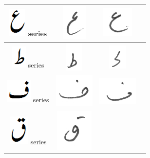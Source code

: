 \documentclass[a4paper,conference]{IEEEtran}
\begin{document}
\begin{table}[h]
\begin{tabular}{@{}cccc@{}}
\hline
\includegraphics[scale=0.15]{aien_orig} series & 
\includegraphics[scale=0.15]{165} & \includegraphics[scale=0.15]{166} &  \\
\hline
\includegraphics[scale=0.15]{tuay_orig} series & \includegraphics[scale=0.15]{167} & 
\includegraphics[scale=0.20]{168} &  \\
\hline
\includegraphics[scale=0.25]{fay_orig} series & \includegraphics[scale=0.25]{169} & \includegraphics[scale=0.25]{170} &  \\
\hline
\includegraphics[scale=0.20]{qaaf_orig} series & \includegraphics[scale=0.15]{171} & & \\

\end{tabular}
\end{table}
\end{document}
